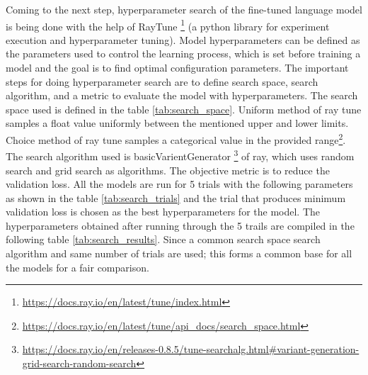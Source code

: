 Coming to the next step, hyperparameter search of the fine-tuned language model is being done with the help of RayTune \footnote{\url{https://docs.ray.io/en/latest/tune/index.html}} (a python library for experiment execution and hyperparameter tuning). Model hyperparameters can be defined as the parameters used to control the learning process, which is set before training a model \cite{bergstra2012random} and the goal is to find optimal configuration parameters. The important steps for doing hyperparameter search are to define search space, search algorithm, and a metric to evaluate the model with hyperparameters. The search space used is defined in the table \ref{tab:search_space}. Uniform method of ray tune samples a float value uniformly between the mentioned upper and lower limits. Choice method of ray tune samples a categorical value in the provided range\footnote{\url{https://docs.ray.io/en/latest/tune/api_docs/search_space.html}}. The search algorithm used is basicVarientGenerator \footnote{\url{https://docs.ray.io/en/releases-0.8.5/tune-searchalg.html#variant-generation-grid-search-random-search}} of ray, which uses random search and grid search as algorithms. The objective metric is to reduce the validation loss. All the models are run for 5 trials with the following parameters as shown in the table \ref{tab:search_trials} and the trial that produces minimum validation loss is chosen as the best hyperparameters for the model.  The hyperparameters obtained after running through the 5 trails are compiled in the following table \ref{tab:search_results}. Since a common search space search algorithm and same number of trials are used; this forms a common base for all the models for a fair comparison.

